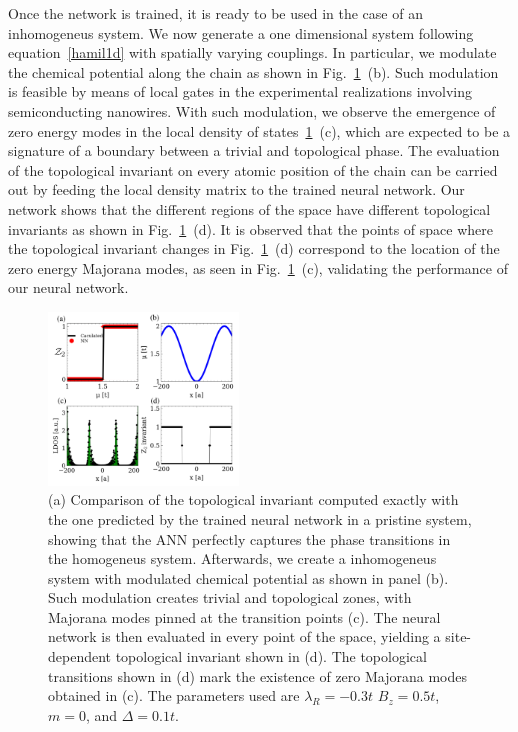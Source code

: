 Once the network is trained, it is ready to be used in the case of an inhomogeneus
system.
We now generate a one dimensional system following equation~\eqref{hamil1d} with
spatially varying couplings.
In particular, we modulate the chemical potential along the chain as shown in
Fig.~\ref{fig4}~(b). Such modulation is feasible by means of local gates in the
experimental realizations involving semiconducting
nanowires.\cite{zhang2016ballistic}
With such modulation, we observe the emergence of zero energy modes in the local
density of states~\ref{fig4}~(c), which are expected to be a signature of a
boundary between a trivial and topological phase.
The evaluation of the topological invariant on every atomic position of the
chain can be carried out by feeding the local density matrix to the trained
neural network.
Our network shows that the different regions of the space have different
topological invariants as shown in Fig.~\ref{fig4}~(d).
It is observed that the points of space where the topological invariant changes
in Fig.~\ref{fig4}~(d) correspond to the location of the zero energy Majorana
modes, as seen in Fig.~\ref{fig4}~(c), validating the performance of our neural network.


\begin{figure}[t!]
\centering
\includegraphics[width=0.45\textwidth]{ann/figures/fig4.pdf}
\vspace{-5pt}
\caption{
(a) Comparison of the topological invariant computed exactly with the one
predicted by the trained neural network in a pristine system,
showing that the ANN perfectly captures the phase transitions
in the homogeneus system. Afterwards, we
create a inhomogeneus system with modulated chemical potential as shown in
panel (b).
Such modulation creates trivial and topological zones, with Majorana modes
pinned at the transition points (c).
The neural network is then evaluated in every point of the space, yielding a
site-dependent topological invariant shown in (d). The topological
transitions shown in (d) mark the existence of zero Majorana modes obtained
in (c).
The parameters used are $\lambda_R=-0.3t$
$B_{z}=0.5t$, $m=0$, and $\Delta =0.1t$.
}
\label{fig4}
\end{figure}

